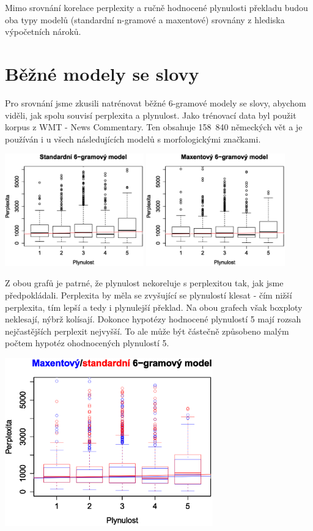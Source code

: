 \documentclass[12pt,a4paper]{report}
\begin{document}
Mimo srovnání korelace perplexity a ručně hodnocené plynulosti překladu budou oba typy modelů (standardní n-gramové a maxentové) srovnány z hlediska výpočetních nároků.

\section{Běžné modely se slovy}
Pro srovnání jsme zkusili natrénovat běžné 6-gramové modely se slovy, abychom viděli, jak spolu souvisí perplexita a plynulost. Jako trénovací data byl použit korpus z WMT - News Commentary. Ten obsahuje 158~840 německých vět a je používán i u všech následujících modelů s morfologickými značkami.
\begin{center}
	\includegraphics[width=60mm]{./grafy/morf/ngram/text.svg.eps}
	\includegraphics[width=60mm]{./grafy/morf/maxent/text.svg.eps}
\end{center}
Z obou grafů je patrné, že plynulost nekoreluje s perplexitou tak, jak jsme předpokládali. Perplexita by měla se zvyšující se plynulostí klesat - čím nižší perplexita, tím lepší a tedy i plynulejší překlad. Na obou grafech však boxploty neklesají, nýbrž kolísají. Dokonce hypotézy hodnocené plynulostí 5 mají rozsah nejčastějších perplexit nejvyšší. To ale může být částečně způsobeno malým počtem hypotéz ohodnocených plynulostí 5.
\begin{center}
	\includegraphics[width=90mm]{./grafy/morf/porovnani/text.svg.eps}
\end{center}
\end{document}
